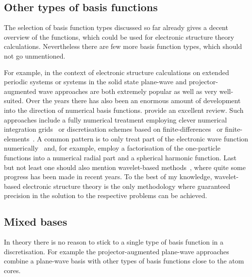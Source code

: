 




\subsection{Other types of basis functions}
The selection of basis function types discussed so far
already gives a decent overview of the functions,
which could be used for electronic structure theory calculations.
Nevertheless there are few more basis function types,
which should not go unmentioned.

For example, in the context of electronic structure calculations
on extended periodic systems or systems in the solid state
plane-wave and projector-augmented wave approaches%
\cite{Kresse1996,Kresse1999,Mortensen2005,Enkovaara2010}
are both extremely popular as well as very well-suited.
Over the years there has also been an enormous amount of development
into the direction of numerical basis functions.
\citet{Frediani2015} provide an excellent review.
Such approaches include a fully numerical treatment employing clever
numerical integration grids~\cite{Losilla2012DCRsp,Toivanen2015,Enkovaara2010}
or discretisation schemes
based on finite-differences~\cite{Kobus2013}
or finite-elements~\cite{Tsuchida1995,Briggs1996,%
Pask05,Lehtovaara2009,Alizadegan2010,Avery2011PhD,Davydov2015,Boffi2016}.
A common pattern is to only treat part of the electronic
wave function numerically~\cite{Fischer1978,Soler2002,LUCAS}
and, for example,
employ a factorisation of the one-particle functions
into a numerical radial part and a spherical harmonic function.
Last but not least one should also mention
wavelet-based methods~\cite{Bischoff2011,Bischoff2012,Bischoff2013,Bischoff2014,Bischoff2014a,Bischoff2017},
where quite some progress has been made in recent years.
To the best of my knowledge, wavelet-based electronic structure theory
is the only methodology where guaranteed precision in the solution to the
respective problems can be achieved.

\subsection{Mixed bases}
In theory there is no reason to stick to a single type of basis function
in a discretisation.
For example the projector-augmented plane-wave
approaches~\cite{Kresse1996,Kresse1999,Mortensen2005,Enkovaara2010}
combine a plane-wave basis
with other types of basis functions close to the atom cores.


